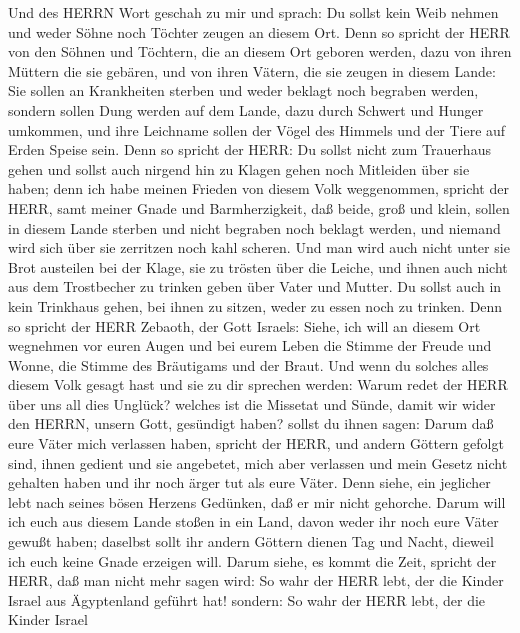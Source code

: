  Und des HERRN Wort geschah zu mir und sprach: 
Du sollst kein Weib nehmen und weder Söhne noch Töchter zeugen an diesem
Ort.  Denn so spricht der HERR von den Söhnen und Töchtern,
die an diesem Ort geboren werden, dazu von ihren Müttern die sie
gebären, und von ihren Vätern, die sie zeugen in diesem Lande:
 Sie sollen an Krankheiten sterben und weder beklagt noch
begraben werden, sondern sollen Dung werden auf dem Lande, dazu durch
Schwert und Hunger umkommen, und ihre Leichname sollen der Vögel des
Himmels und der Tiere auf Erden Speise sein.  Denn so
spricht der HERR: Du sollst nicht zum Trauerhaus gehen und sollst auch
nirgend hin zu Klagen gehen noch Mitleiden über sie haben; denn ich habe
meinen Frieden von diesem Volk weggenommen, spricht der HERR, samt
meiner Gnade und Barmherzigkeit,  daß beide, groß und klein,
sollen in diesem Lande sterben und nicht begraben noch beklagt werden,
und niemand wird sich über sie zerritzen noch kahl scheren. 
Und man wird auch nicht unter sie Brot austeilen bei der Klage, sie zu
trösten über die Leiche, und ihnen auch nicht aus dem Trostbecher zu
trinken geben über Vater und Mutter.  Du sollst auch in kein
Trinkhaus gehen, bei ihnen zu sitzen, weder zu essen noch zu trinken.
 Denn so spricht der HERR Zebaoth, der Gott Israels: Siehe,
ich will an diesem Ort wegnehmen vor euren Augen und bei eurem Leben die
Stimme der Freude und Wonne, die Stimme des Bräutigams und der Braut.
 Und wenn du solches alles diesem Volk gesagt hast und sie
zu dir sprechen werden: Warum redet der HERR über uns all dies Unglück?
welches ist die Missetat und Sünde, damit wir wider den HERRN, unsern
Gott, gesündigt haben?  sollst du ihnen sagen: Darum daß
eure Väter mich verlassen haben, spricht der HERR, und andern Göttern
gefolgt sind, ihnen gedient und sie angebetet, mich aber verlassen und
mein Gesetz nicht gehalten haben  und ihr noch ärger tut
als eure Väter. Denn siehe, ein jeglicher lebt nach seines bösen Herzens
Gedünken, daß er mir nicht gehorche.  Darum will ich euch
aus diesem Lande stoßen in ein Land, davon weder ihr noch eure Väter
gewußt haben; daselbst sollt ihr andern Göttern dienen Tag und Nacht,
dieweil ich euch keine Gnade erzeigen will.  Darum siehe,
es kommt die Zeit, spricht der HERR, daß man nicht mehr sagen wird: So
wahr der HERR lebt, der die Kinder Israel aus Ägyptenland geführt hat!
 sondern: So wahr der HERR lebt, der die Kinder Israel
